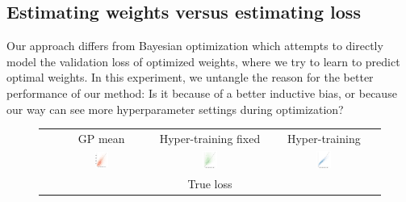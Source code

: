 \documentclass{article} %
\begin{document}
\subsection{Estimating weights versus estimating loss}
Our approach differs from Bayesian optimization which attempts to directly model the validation loss of optimized weights, where we try to learn to predict optimal weights.
In this experiment, we untangle the reason for the better performance of our method:
Is it because of a better inductive bias, or because our way can see more hyperparameter settings during optimization?
\begin{figure}
	\begin{tabular}{@{\hskip3pt}c @{\hskip3pt}c @{\hskip3pt}c @{\hskip3pt}c} 
	&GP mean\hspace{0.02\textwidth}&Hyper-training fixed&\hspace{0.02\textwidth}Hyper-training\\
	\rotatebox{90}{\,\,\,\,\,\,\,\,\,\,\,\, Inferred loss}\hspace{-0.02\textwidth}&\includegraphics[width=0.14\textwidth]{ax0_scatter.pdf}&\includegraphics[width=0.14\textwidth]{ax1_scatter.pdf}&\includegraphics[width=0.14\textwidth]{ax2_scatter.pdf}\\
	&&True loss&\\

\end{tabular}
\end{figure}
\end{document}

